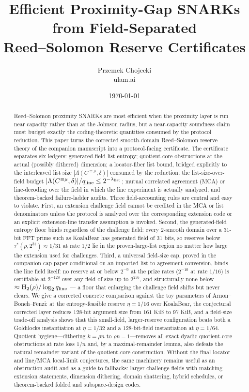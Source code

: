 \documentclass[11pt]{article}
\title{Efficient Proximity-Gap SNARKs from Field-Separated\\ Reed--Solomon Reserve Certificates}
\author{Przemek Chojecki\\ \small ulam.ai}
\date{\today}
\theoremstyle{definition}
\newcommand{\Hbin}{\operatorname{H}_2}
\newcommand{\taustar}{\tau^{*}}
\newcommand{\qline}{q_{\rm line}}
\newcommand{\Int}[2]{#1^{\equiv #2}}
\begin{document}
\maketitle

\begin{abstract}
Reed--Solomon proximity SNARKs are most efficient when the proximity layer is run near capacity rather than at the Johnson radius, but a near-capacity soundness claim must budget exactly the coding-theoretic quantities consumed by the protocol reduction.  This paper turns the corrected smooth-domain Reed--Solomon reserve theory of the companion manuscript into a protocol-facing certificate.  The certificate separates six ledgers: generated-field list entropy; quotient-core obstructions at the actual (possibly dithered) dimension; a locator-fiber list bound, bridged explicitly to the interleaved list size $|\Lambda(\Int{C}{\mu},\delta)|$ consumed by the reduction; the list-size-over-field budget $|\Lambda(\Int{C}{\mu},\delta)|/\qline\le2^{-\lambda_{\rm list}}$; mutual correlated agreement (MCA) or line-decoding over the field in which the line experiment is actually analyzed; and theorem-backed failure-ladder audits.  Three field-accounting rules are central and easy to violate.  First, an extension challenge field cannot be credited in the MCA or list denominators unless the protocol is analyzed over the corresponding extension code or an explicit extension-line transfer assumption is invoked.  Second, the generated-field entropy floor binds regardless of the challenge field: every $2$-smooth domain over a $31$-bit FFT prime such as KoalaBear has generated field of $31$ bits, so reserves below $\taustar(\rho,2^{31})\approx1/31$ at rate $1/2$ lie in the proven-large-list region no matter how large the extension used for challenges.  Third, a universal field-size cap, proved in the companion cap paper conditional on an imported list-to-agreement conversion, binds the line field itself: no reserve at or below $2^{-9}$ at the prize rates ($2^{-10}$ at rate $1/16$) is certifiable at $2^{-128}$ over any field of size up to $2^{256}$, and structurally none below $\approx\Hbin(\rho)/\log_2\qline$ --- a floor that enlarging the challenge field shifts but never clears.  We give a corrected concrete comparison against the toy parameters of Arnon--Boneh--Fenzi: at the entropy-feasible reserve $\eta=1/16$ over KoalaBear, the conjectural corrected layer reduces $128$-bit argument size from $161$ KiB to $97$ KiB, and a field-size trade-off analysis shows that this small-field, larger-reserve configuration beats both a Goldilocks instantiation at $\eta=1/32$ and a $128$-bit-field instantiation at $\eta=1/64$.  Quotient hygiene---dithering $k=\rho n$ to $\rho n-1$---removes all exact dyadic quotient-core obstructions at rate loss $1/n$ and, by a maximal-remainder lemma, also defeats the natural remainder variant of the quotient-core construction.  Without the final locator and line/MCA local-limit conjectures, the same machinery remains useful as an obstruction audit and as a guide to fallbacks: larger challenge fields with matching extension statements, dimension dithering, domain shattering, hybrid schedules, or theorem-backed folded and subspace-design codes.
\end{abstract}
\end{document}
